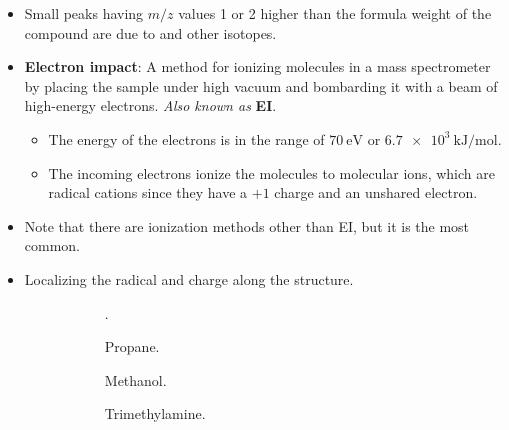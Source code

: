 \documentclass[../notes.tex]{subfiles}
\begin{document}
\begin{itemize}
\begin{itemize}
    \end{itemize}
    \item Small peaks having $m/z$ values 1 or 2 higher than the formula weight of the compound are due to  and other isotopes.
    \item \textbf{Electron impact}: A method for ionizing molecules in a mass spectrometer by placing the sample under high vacuum and bombarding it with a beam of high-energy electrons. \emph{Also known as} \textbf{EI}.
    \begin{itemize}
        \item The energy of the electrons is in the range of $\SI{70}{\electronvolt}$ or $\SI[per-mode=symbol]{6.7e3}{\kilo\joule\per\mole}$.
        \item The incoming electrons ionize the molecules to molecular ions, which are radical cations since they have a $+1$ charge and an unshared electron.
    \end{itemize}
    \item Note that there are ionization methods other than EI, but it is the most common.
    \item Localizing the radical and charge along the structure.
    \begin{figure}[h!]
        \centering
        \footnotesize
        \begin{subfigure}[b]{0.24\linewidth}
            \centering
            \ce{[CH3CH2CH3]+}\hspace{-4.8pt}.
            \caption{Propane.}
            \label{fig:molecularIonsa}
        \end{subfigure}
        \begin{subfigure}[b]{0.24\linewidth}
            \centering
            \caption{Methanol.}
            \label{fig:molecularIonsb}
        \end{subfigure}
        \begin{subfigure}[b]{0.24\linewidth}
            \centering
            \caption{Trimethylamine.}
            \label{fig:molecularIonsc}
        \end{subfigure}
        \begin{subfigure}[b]{0.24\linewidth}
            \centering
\end{subfigure}
\end{figure}
\end{itemize}
\end{document}
